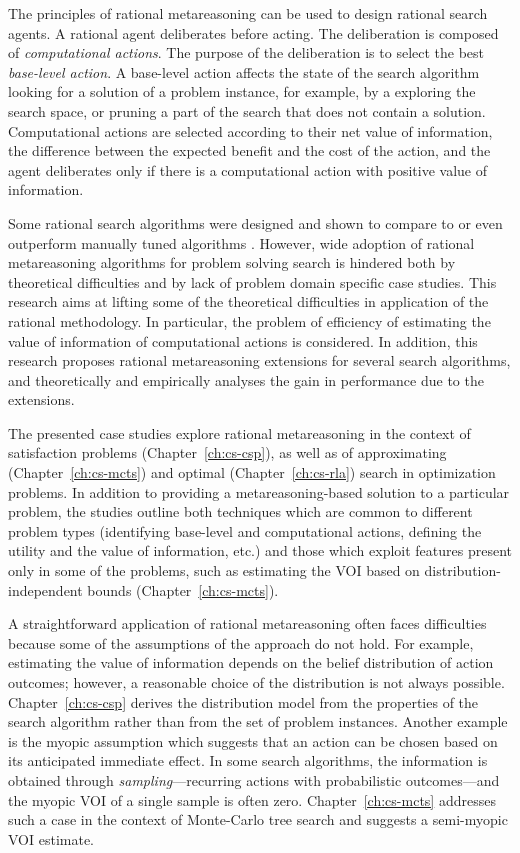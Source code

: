The principles of rational metareasoning \cite{Russell.right} can be
used to design rational search agents. A rational agent deliberates
before acting. The deliberation is composed of {\em computational
  actions}. The purpose of the deliberation is to select the best {\em
  base-level action}. A base-level action affects the state of the
search algorithm looking for a solution of a problem instance, for
example, by a exploring the search space, or pruning a part of the
search that does not contain a solution. Computational actions are
selected according to their net value of information, the difference
between the expected benefit and the cost of the action, and the agent
deliberates only if there is a computational action with positive
value of information.

Some rational search algorithms were designed and shown to compare to
or even outperform manually tuned algorithms
\cite{Russell.right}. However, wide adoption of rational metareasoning
algorithms for problem solving search is hindered both by theoretical
difficulties and by lack of problem domain specific case studies. This
research aims at lifting some of the theoretical difficulties in
application of the rational methodology. In particular, the problem of
efficiency of estimating the value of information of computational
actions is considered. In addition, this research proposes rational
metareasoning extensions for several search algorithms, and
theoretically and empirically analyses the gain in performance due to
the extensions.

The presented case studies explore rational
metareasoning in the context of satisfaction problems
(Chapter~\ref{ch:cs-csp}), as well as of approximating
(Chapter~\ref{ch:cs-mcts}) and optimal (Chapter~\ref{ch:cs-rla})
search in optimization problems. In addition to providing a
metareasoning-based solution to a particular problem, the studies
outline both techniques which are common to different problem types
(identifying base-level and computational actions, 
defining the utility and the value of information, etc.)
and those which exploit features present only in some of the problems,
such as estimating the VOI based on distribution-independent bounds
(Chapter~\ref{ch:cs-mcts}). 

A straightforward application of rational metareasoning often faces
difficulties because some of the assumptions of the approach do not
hold. For example, estimating the value of information depends on
the belief distribution of action outcomes; however, a reasonable choice
of the distribution is not always possible. Chapter~\ref{ch:cs-csp}
derives the distribution model from the properties of the search
algorithm rather than from the set of problem instances. Another
example is the myopic assumption \cite{Russell.right} which suggests
that an action can be chosen based on its anticipated immediate
effect. In some search algorithms, the information is obtained through
\emph{sampling}---recurring actions with probabilistic outcomes---and
the myopic VOI of a single sample is often
zero. Chapter~\ref{ch:cs-mcts} addresses such a case in the context
of Monte-Carlo tree search and suggests a semi-myopic VOI estimate.

